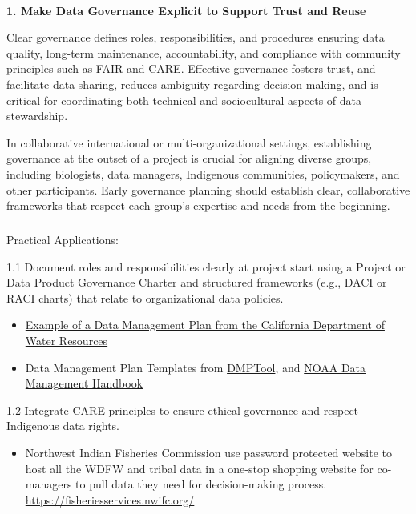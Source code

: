 \documentclass[
  letterpaper,
  DIV=11,
  numbers=noendperiod]{scrartcl}
\makeatletter
\let\oldparagraph\paragraph
\renewcommand{\paragraph}{
    \@ifstar
      \xxxParagraphStar
      \xxxParagraphNoStar
  }
\newcommand{\xxxParagraphStar}[1]{\oldparagraph*{#1}\mbox{}}
\newcommand{\xxxParagraphNoStar}[1]{\oldparagraph{#1}\mbox{}}
\let\oldsubparagraph\subparagraph
\renewcommand{\subparagraph}{
    \@ifstar
      \xxxSubParagraphStar
      \xxxSubParagraphNoStar
  }
\newcommand{\xxxSubParagraphStar}[1]{\oldsubparagraph*{#1}\mbox{}}
\newcommand{\xxxSubParagraphNoStar}[1]{\oldsubparagraph{#1}\mbox{}}
\providecommand{\tightlist}{%
  \setlength{\itemsep}{0pt}\setlength{\parskip}{0pt}}
\makeatother
\begin{document}
\paragraph{\texorpdfstring{\textbf{1. Make Data Governance Explicit to
Support Trust and
Reuse}}{1. Make Data Governance Explicit to Support Trust and Reuse}}\label{make-data-governance-explicit-to-support-trust-and-reuse}

Clear governance defines roles, responsibilities, and procedures
ensuring data quality, long-term maintenance, accountability, and
compliance with community principles such as FAIR and CARE. Effective
governance fosters trust, and facilitate data sharing, reduces ambiguity
regarding decision making, and is critical for coordinating both
technical and sociocultural aspects of data stewardship.

In collaborative international or multi-organizational settings,
establishing governance at the outset of a project is crucial for
aligning diverse groups, including biologists, data managers, Indigenous
communities, policymakers, and other participants. Early governance
planning should establish clear, collaborative frameworks that respect
each group's expertise and needs from the beginning.~

\subparagraph{Practical Applications:}\label{practical-applications}

1.1 Document roles and responsibilities clearly at project start using a
Project or Data Product Governance Charter and structured frameworks
(e.g., DACI or RACI charts) that relate to organizational data policies.

\begin{itemize}
\item
  \href{https://raw.githubusercontent.com/Br-Johnson/sdm-paper/refs/heads/main/examples/Cal_DMP.pdf}{Example
  of a Data Management Plan from the California Department of Water
  Resources}
\item
  Data Management Plan Templates from
  \href{https://dmptool.org/public_templates?page=ALL}{DMPTool}, and
  \href{https://www.noaa.gov/sites/default/files/2025-03/NAO_212-15B_-_Data_Management_Handbook.pdf}{NOAA
  Data Management Handbook}
\end{itemize}

1.2 Integrate CARE principles to ensure ethical governance and respect
Indigenous data rights.

\begin{itemize}
\tightlist
\item
  Northwest Indian Fisheries Commission use password protected website
  to host all the WDFW and tribal data in a one-stop shopping website
  for co-managers to pull data they need for decision-making process.
  \url{https://fisheriesservices.nwifc.org/}
\end{itemize}
\end{document}
